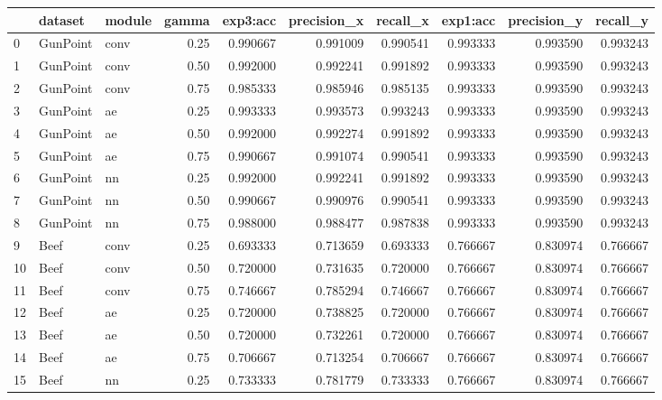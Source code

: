 \begin{tabular}{lllrrrrrrr}
\toprule
{} &   dataset & module &  gamma &  exp3:acc &  precision\_x &  recall\_x &  exp1:acc &  precision\_y &  recall\_y \\
\midrule
0  &  GunPoint &   conv &   0.25 &  0.990667 &     0.991009 &  0.990541 &  0.993333 &     0.993590 &  0.993243 \\
1  &  GunPoint &   conv &   0.50 &  0.992000 &     0.992241 &  0.991892 &  0.993333 &     0.993590 &  0.993243 \\
2  &  GunPoint &   conv &   0.75 &  0.985333 &     0.985946 &  0.985135 &  0.993333 &     0.993590 &  0.993243 \\
3  &  GunPoint &     ae &   0.25 &  0.993333 &     0.993573 &  0.993243 &  0.993333 &     0.993590 &  0.993243 \\
4  &  GunPoint &     ae &   0.50 &  0.992000 &     0.992274 &  0.991892 &  0.993333 &     0.993590 &  0.993243 \\
5  &  GunPoint &     ae &   0.75 &  0.990667 &     0.991074 &  0.990541 &  0.993333 &     0.993590 &  0.993243 \\
6  &  GunPoint &     nn &   0.25 &  0.992000 &     0.992241 &  0.991892 &  0.993333 &     0.993590 &  0.993243 \\
7  &  GunPoint &     nn &   0.50 &  0.990667 &     0.990976 &  0.990541 &  0.993333 &     0.993590 &  0.993243 \\
8  &  GunPoint &     nn &   0.75 &  0.988000 &     0.988477 &  0.987838 &  0.993333 &     0.993590 &  0.993243 \\
9  &      Beef &   conv &   0.25 &  0.693333 &     0.713659 &  0.693333 &  0.766667 &     0.830974 &  0.766667 \\
10 &      Beef &   conv &   0.50 &  0.720000 &     0.731635 &  0.720000 &  0.766667 &     0.830974 &  0.766667 \\
11 &      Beef &   conv &   0.75 &  0.746667 &     0.785294 &  0.746667 &  0.766667 &     0.830974 &  0.766667 \\
12 &      Beef &     ae &   0.25 &  0.720000 &     0.738825 &  0.720000 &  0.766667 &     0.830974 &  0.766667 \\
13 &      Beef &     ae &   0.50 &  0.720000 &     0.732261 &  0.720000 &  0.766667 &     0.830974 &  0.766667 \\
14 &      Beef &     ae &   0.75 &  0.706667 &     0.713254 &  0.706667 &  0.766667 &     0.830974 &  0.766667 \\
15 &      Beef &     nn &   0.25 &  0.733333 &     0.781779 &  0.733333 &  0.766667 &     0.830974 &  0.766667 \\

\end{tabular}
